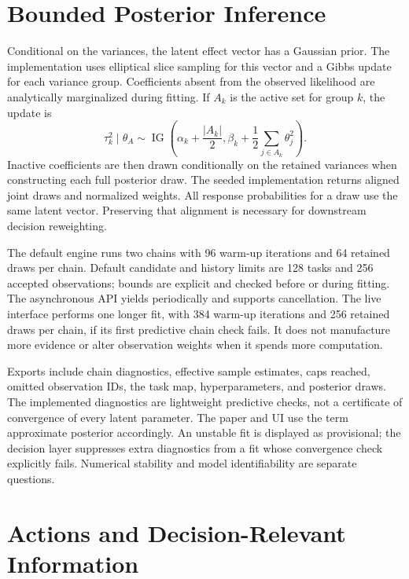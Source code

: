 \documentclass{article}
\begin{document}
\section{Bounded Posterior Inference}

Conditional on the variances, the latent effect vector has a Gaussian prior.
The implementation uses elliptical slice sampling
\citep{murray2010elliptical} for this vector and a Gibbs update for each
variance group. Coefficients absent from the observed likelihood are
analytically marginalized during fitting. If \(A_k\) is the active set for
group \(k\), the update is
\begin{equation}
 \tau_k^2\mid\theta_A \sim
 \operatorname{IG}\left(
 \alpha_k+\frac{|A_k|}{2},
 \beta_k+\frac12\sum_{j\in A_k}\theta_j^2
 \right).
\label{eq:gibbs}
\end{equation}
Inactive coefficients are then drawn conditionally on the retained variances
when constructing each full posterior draw. The seeded implementation returns
aligned joint draws and normalized weights.
All response probabilities for a draw use the same latent vector. Preserving
that alignment is necessary for downstream decision reweighting.

The default engine runs two chains with 96 warm-up iterations and 64 retained
draws per chain. Default candidate and history limits are 128 tasks and 256
accepted observations; bounds are explicit and checked before or during
fitting. The asynchronous API yields periodically and supports cancellation.
The live interface performs one longer fit, with 384 warm-up iterations and
256 retained draws per chain, if its first predictive chain check fails.
It does not manufacture more evidence or alter observation weights when it
spends more computation.

Exports include chain diagnostics, effective sample estimates, caps reached,
omitted observation IDs, the task map, hyperparameters, and posterior draws.
The implemented diagnostics are lightweight predictive checks, not a
certificate of convergence of every latent parameter. The paper and UI use
the term approximate posterior accordingly. An unstable fit is displayed as
provisional; the decision layer suppresses extra diagnostics from a fit whose
convergence check explicitly fails. Numerical stability and model
identifiability are separate questions.

\section{Actions and Decision-Relevant Information}
\label{sec:decision}
\end{document}
